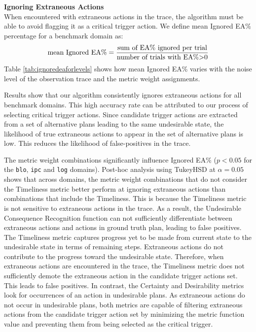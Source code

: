 \textbf{Ignoring Extraneous Actions}\\
When encountered with extraneous actions in the trace, the algorithm must be able to avoid flagging it as a critical trigger action. 
We define mean Ignored EA\% percentage for a benchmark domain as: 
\begin{equation}
\textup{mean Ignored EA\%} = \frac{\textup{sum of  EA\% ignored per trial}}{\textup{number of trials with EA\%$>$0}}
\end{equation}
Table \ref{tab:ignoredeaforlevels} shows how mean Ignored EA\% varies with the noise level of the observation trace and the metric weight assignments.

Results show that our algorithm consistently ignores extraneous actions for all benchmark domains. 
This high accuracy rate can be attributed to our process of selecting critical trigger actions. 
Since candidate trigger actions are extracted from a set of alternative plans leading to the same undesirable state, the likelihood of true extraneous actions to appear in the set of alternative plans is low. 
This reduces the likelihood of false-positives in the trace.


The metric weight combinations significantly influence Ignored EA\%  ($p<0.05$ for the \texttt{blo}, \texttt{ipc} and \texttt{log} domains).
 Post-hoc analysis using TukeyHSD at $\alpha=0.05$ shows that across domains, the metric weight combinations that do not consider the Timeliness metric better perform at ignoring extraneous actions than combinations that include the Timeliness. 
 This is because the Timeliness metric is not sensitive to extraneous actions in the trace. 
 As a result, the Undesirable Consequence Recognition function can not sufficiently differentiate between extraneous actions and actions in ground truth plan, leading to false positives. 
 The Timeliness metric captures progress yet to be made from current state to  the undesirable state in terms of remaining steps.
 Extraneous actions do not contribute to the progress toward the undesirable state.
 Therefore, when extraneous actions are encountered in the trace, the Timeliness metric does not sufficiently demote the extraneous action in the candidate trigger actions set. 
 This leads to false positives.
 In contrast, the Certainty and Desirability metrics look for occurrences of an action in undesirable plans. 
 As extraneous actions do not occur in undesirable plans, both metrics are capable of filtering extraneous actions from the candidate trigger action set by minimizing the metric function value and preventing them from being selected as the critical trigger.


